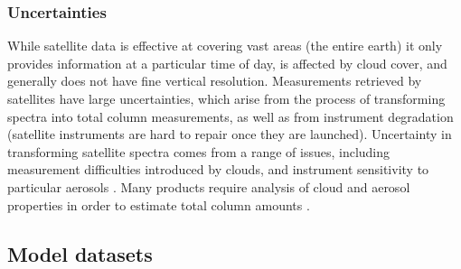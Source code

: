    \subsubsection{Uncertainties}
      
      While satellite data is effective at covering vast areas (the entire earth) it only provides information at a particular time of day, is affected by cloud cover, and generally does not have fine vertical resolution.
      Measurements retrieved by satellites have large uncertainties, which arise from the process of transforming spectra into total column measurements, as well as from instrument degradation (satellite instruments are hard to repair once they are launched).
      Uncertainty in transforming satellite spectra comes from a range of issues, including measurement difficulties introduced by clouds, and instrument sensitivity to particular aerosols \parencite{Millet2006}.
      Many products require analysis of cloud and aerosol properties in order to estimate total column amounts \parencite{Palmer2001,Palmer2003, Marais2012, Vasilkov2017}.
      
      
      
  \subsection{Model datasets}
    
